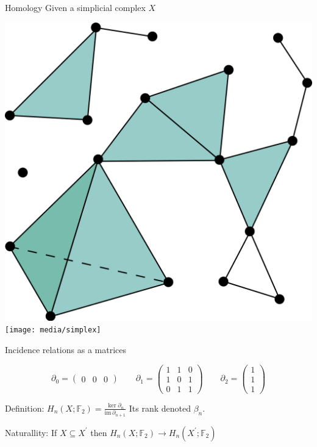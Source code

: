 \documentclass[10pt,t, handout]{beamer} %
\begin{document}
\begin{frame}[c]{Homology}
	Given a simplicial complex $X$
	\begin{center}
		\includegraphics[scale=.05]{media/simplicial_complex}
		\qquad\qquad
		\pause
		\texttt{[image: media/simplex]}
	\end{center}
	
	Incidence relations as a matrices
	
	\begin{equation*}
	\partial_0 =
	\begin{pmatrix}
	0 & 0 & 0 
	\end{pmatrix}
	\qquad
	\partial_1 =
	\begin{pmatrix}
	1 & 1 & 0 \\
	1 & 0 & 1 \\
	0 & 1 & 1 
	\end{pmatrix}
	\qquad
	\partial_2 =
	\begin{pmatrix}
	1 \\
	1 \\
	1 
	\end{pmatrix}
	\end{equation*}
	
	\vskip 5pt
	\pause
	
	\textcolor{pblue}{Definition:} $\displaystyle{H_n(X; \mathbb F_2) = \frac{\ker \partial_n}{\mathrm{im}\, \partial_{n+1}}}$ \quad Its rank denoted $\beta_n$.
	
	\vskip 15pt
	\pause
	
	\textcolor{pblue}{Naturallity:}	
	If $X \subseteq X^\prime$ then $H_n(X; \mathbb F_2) \to H_n(X^\prime; \mathbb F_2)$
\end{frame}
\end{document}
